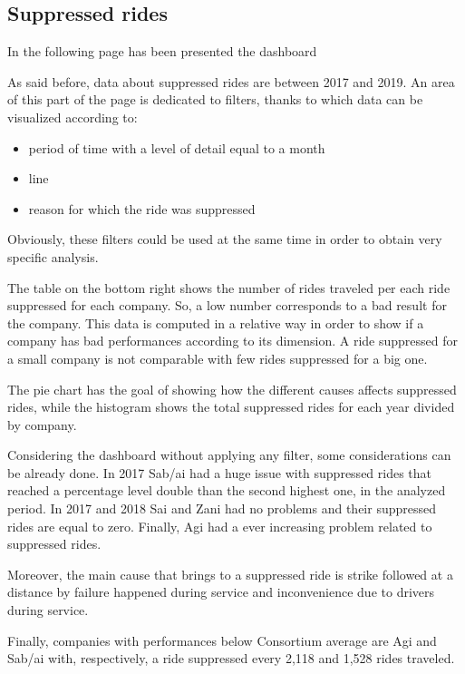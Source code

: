 \subsection{Suppressed rides}
In the following page has been presented the dashboard
\newpage
\begin{landscape}
\thispagestyle{empty}

\end{landscape}
\newpage
As said before, data about suppressed rides are between 2017 and 2019. An area of this part of the page is dedicated to filters, thanks to which data can be visualized according to:
\begin{itemize}
\item  period of time with a level of detail equal to a month
\item line
\item reason for which the ride was suppressed
\end{itemize}
Obviously, these filters could be used at the same time in order to obtain very specific analysis.

The table on the bottom right shows the number of rides traveled per each ride suppressed for each company. So, a low number corresponds to a bad result for the company. This data is computed in a relative way in order to show if a company has bad performances according to its dimension. A ride suppressed for a small company is not comparable with few rides suppressed for a big one. 

The pie chart has the goal of showing how the different causes affects suppressed rides, while the histogram shows the total suppressed rides for each year divided by company. 

Considering the dashboard without applying any filter, some considerations can be already done. In 2017 Sab/ai had a huge issue with suppressed rides that reached a percentage level double than the second highest one, in the analyzed period. In 2017 and 2018 Sai and Zani had no problems and their suppressed rides are equal to zero. Finally, Agi had a ever increasing problem related to suppressed rides. 

Moreover, the main cause that brings to a suppressed ride is strike followed at a distance by failure happened during service and inconvenience due to drivers during service. 

Finally, companies with performances below Consortium average are Agi and Sab/ai with, respectively, a ride suppressed every 2,118 and 1,528 rides traveled. 

